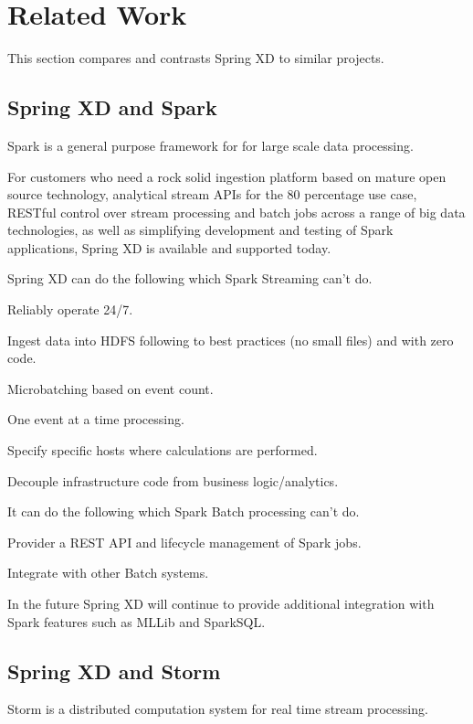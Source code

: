 \section{Related Work}
This section compares and contrasts Spring XD to similar projects.

\subsection{Spring XD and Spark}
Spark is a general purpose framework for for large scale data processing.

For customers who need a rock solid ingestion platform based on mature open source technology, analytical stream APIs for the 80 percentage use case, RESTful control over stream processing and batch jobs across a range of big data technologies, as well as simplifying development and testing of Spark applications, Spring XD is available and supported today.

Spring XD can do the following which Spark Streaming can't do.

\begin{itemize*}
\item Reliably operate 24/7.
\item Ingest data into HDFS following to best practices (no small files) and with zero code.
\item Microbatching based on event count.
\item One event at a time processing.
\item Specify specific hosts where calculations are performed.
\item Decouple infrastructure code from business logic\slash analytics.
\end{itemize*}

It can do the following which Spark Batch processing can't do.

\begin{itemize*}
\item Provider a REST API and lifecycle management of Spark jobs.
\item Integrate with other Batch systems.
\end{itemize*}

In the future Spring XD will continue to provide additional integration with Spark features such as MLLib and SparkSQL.

\subsection{Spring XD and Storm}
Storm is a distributed computation system for real time stream processing.

